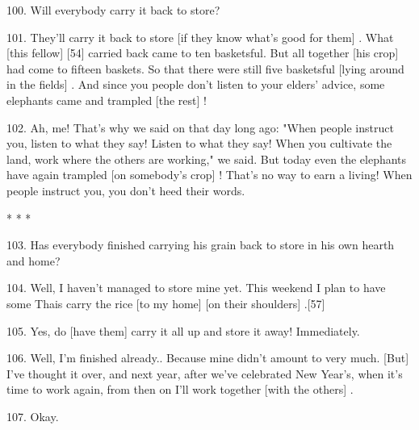 100. Will everybody carry it back to store?

101. They'll carry it back to store [if they know what's good for them] . What
[this fellow] [54] carried back came to ten basketsful. But all together [his
crop] had come to fifteen baskets. So that there were still five basketsful [lying
around in the fields] . And since you people don't listen to your elders' advice,
some elephants came and trampled [the rest] !

102. Ah, me! That's why we said on that day long ago: "When people instruct
you, listen to what they say! Listen to what they say! When you cultivate the land,
work where the others are working," we said. But today even the elephants
have again trampled [on somebody's crop] ! That's no way to earn a living! When
people instruct you, you don't heed their words.

\begin{center}
* * *
\end{center}

103. Has everybody finished carrying his grain back to store in his own hearth
and home?

104. Well, I haven't managed to store mine yet. This weekend I plan to have some
Thais carry the rice [to my home] [on their shoulders] .[57]

105. Yes, do [have them] carry it all up and store it away! Immediately.

106. Well, I'm finished already.. Because mine didn't amount to very much. [But]
I've thought it over, and next year, after we've celebrated New Year's, when it's
time to work again, from then on I'll work together [with the others] .

107. Okay.

